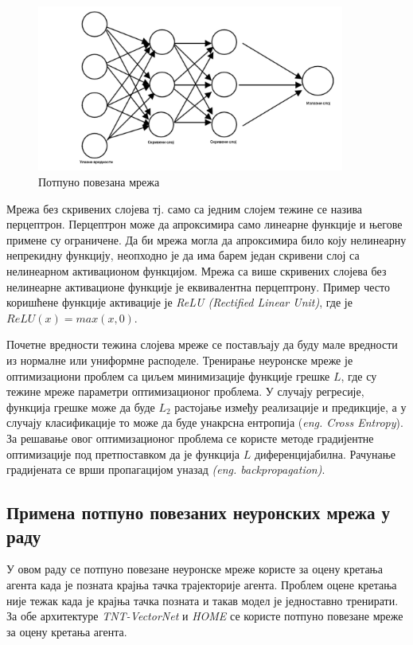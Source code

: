 \documentclass[11pt,oneside]{memoir}
\begin{document}
\begin{figure}[H]
  \centering
  \includegraphics[width=0.9\textwidth]{images/ffn.png}
  \caption{Потпуно повезана мрежа \label{ffn}}
\end{figure}

Мрежа без скривених слојева тј. само са једним слојем тежине се назива перцептрон. Перцептрон може да апроксимира само линеарне функције и 
његове примене су ограничене. Да би мрежа могла да апроксимира било коју нелинеарну непрекидну функцију, неопходно је да има барем
један скривени слој са нелинеарном активационом функцијом. Мрежа са више скривених слојева без нелинеарне активационе функције
је еквивалентна перцептрону. Пример често коришћене
функције активације је \textit{ReLU (Rectified Linear Unit)}, где је $ReLU(x) = max(x, 0)$. 

Почетне вредности тежина слојева мреже се постављају да буду мале вредности из нормалне или униформне расподеле. Тренирање неуронске мреже
је оптимизациони проблем са циљем минимизације функције грешке $L$, где су тежине мреже параметри оптимизационог проблема. У случају регресије, 
функција грешке може да буде $L_2$ растојање између реализације и предикције, а у случају класификације то може да буде унакрсна ентропија
(\textit{eng. Cross Entropy}).
За решавање овог оптимизационог проблема се користе методе
градијентне оптимизације под претпоставком да је функција $L$ диференцијабилна. 
Рачунање градијената се врши пропагацијом уназад \textit{(eng. backpropagation)}.

\subsection{Примена потпуно повезаних неуронских мрежа у раду}

У овом раду се потпуно повезане неуронске мреже користе за оцену кретања агента када је позната крајња тачка трајекторије агента. Проблем
оцене кретања није тежак када је крајња тачка позната и такав модел је једноставно тренирати. За обе архитектуре 
\textit{TNT-VectorNet} и \textit{HOME} се користе потпуно повезане мреже за оцену кретања агента.
\end{document}

